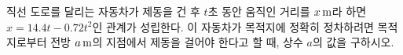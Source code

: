 직선 도로를 달리는 자동차가 제동을 건 후 $t$초 동안 움직인 거리를 $x\mkern3mu \mathrm{m}$라 하면 $x=14.4t-0.72t^2$인 관계가 성립한다. 이 자동차가 목적지에 정확히 정차하려면 목적지로부터 전방 $a\mkern3mu \mathrm{m}$의 지점에서 제동을 걸어야 한다고 할 때, 상수 $a$의 값을 구하시오.
